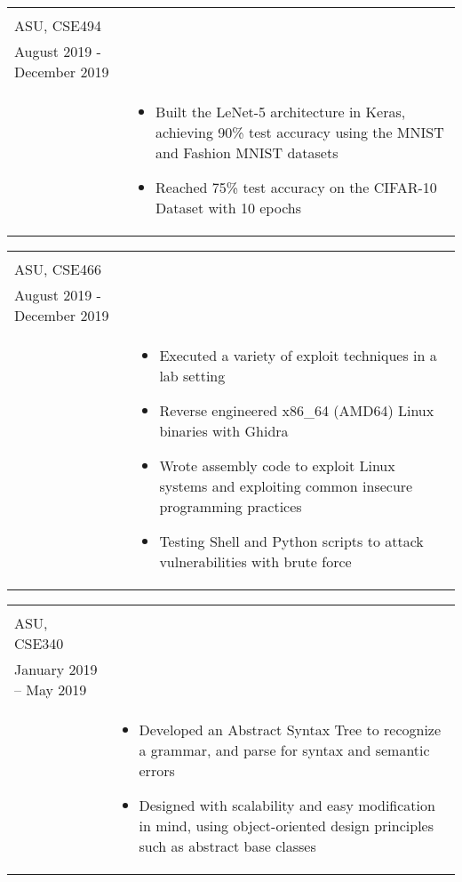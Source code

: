 \documentclass[10pt]{article}
\newcommand{\tabu}[2]{
	\begin{tabular}[t]{ l l }
		#1 & #2
	\end{tabular}}
\begin{document}
		\tabu
		{\begin{minipage}[t]{0.3\linewidth}
				\textbf{Convolutional Neural Networks} \\
				ASU, CSE494\\
				August 2019 - December 2019\\
		\end{minipage}}
		{\begin{minipage}[t]{.7\linewidth}
				\begin{itemize}[noitemsep, topsep=0pt]
					\item Built the LeNet-5 architecture in Keras, achieving 90\% test accuracy using the MNIST and Fashion MNIST datasets
					\item Reached 75\% test accuracy on the CIFAR-10 Dataset with 10 epochs
				\end{itemize}
		\end{minipage}}
		\tabu
		{\begin{minipage}[t]{0.3\linewidth}
				\textbf{CTF Challenges} \\
				ASU, CSE466\\
				August 2019 - December 2019\\
		\end{minipage}}
		{\begin{minipage}[t]{.7\linewidth}
				\begin{itemize}[noitemsep, topsep=0pt]
					\item Executed a variety of exploit techniques in a lab setting
					\item Reverse engineered x86\_64 (AMD64) Linux binaries with Ghidra
					\item Wrote assembly code to exploit Linux systems and exploiting common insecure programming practices
					\item Testing Shell and Python scripts to attack vulnerabilities with brute force
				\end{itemize}
		\end{minipage}}	
		\tabu
		{\begin{minipage}[t]{0.3\linewidth}
				\textbf{Abstract Syntax Tree} \\
				ASU, CSE340\\
				January 2019 – May 2019\\
		\end{minipage}}
		{\begin{minipage}[t]{.7\linewidth}
				\begin{itemize}[noitemsep, topsep=0pt]
					\item Developed an Abstract Syntax Tree to recognize a grammar, and parse for syntax and semantic errors
					\item Designed with scalability and easy modification in mind, using object-oriented design principles such as abstract base classes
				\end{itemize}
		\end{minipage}}	
\end{document}
